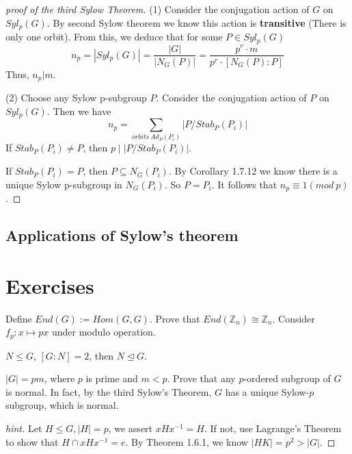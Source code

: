 \documentclass[11pt,fleqn]{book} %
\begin{document}
\begin{CJK}{UTF8}{gkai}
\begin{proof}
	[proof of the third Sylow Theorem] 
	(1) Consider the conjugation action of $G$ on $Syl_p(G)$. By second Sylow theorem we know this action is {\bf transitive} (There is only one orbit). From this, we deduce that for some $P \in Syl_p(G)$
	\[n_p = |Syl_p(G)| = \frac {|G|} {|N_G(P)|}= \frac {p^r \cdot m} {p^r \cdot [N_G(P) : P]}\] 
	Thus, $n_p | m$.

	(2) Choose any Sylow p-subgroup $P$. Consider the conjugation action of $P$ on $Syl_p(G)$. Then we have 
	\[n_p = \sum_{orbits \ Ad_P(P_i)} |P/Stab_P(P_i)|\]
	If $Stab_P(P_i) \neq P$, then $ p \mid |P/Stab_P(P_i)|$. 

	If $Stab_P(P_i) = P$, then $P \subseteq N_G(P_i)$. By Corollary 1.7.12 we know there is a unique Sylow p-subgroup in $N_G(P_i)$. So $P = P_i$.
	It follows that $n_p \equiv 1 (mod \ p)$.
\end{proof}

\subsection{Applications of Sylow's theorem}

\section{Exercises}

\begin{proposition}
	Define $End(G) := Hom(G, G)$. Prove that $End(\mathbb{Z}_n) \cong \mathbb{Z}_n$. Consider $f_p : x \mapsto px$ under modulo operation.
\end{proposition}

\begin{proposition}
	$N \le G$, $[G : N] = 2$, then $N \unlhd G$.
\end{proposition}

\begin{proposition}
	$|G| = pm$, where $p$ is prime and $m < p$. Prove that any $p$-ordered subgroup of $G$ is normal. In fact, by the third Sylow's Theorem, $G$ has a unique Sylow-$p$ subgroup, which is normal.
\end{proposition}

\begin{proof}
	[hint] Let $H \le G, |H|=p$, we assert $xHx^{-1} = H$. If not, use Lagrange's Theorem to show that $H \cap xHx^{-1} = e$. By Theorem 1.6.1, we know $|HK| = p^2 > |G|$.
\end{proof}


\end{CJK}
\end{document}
